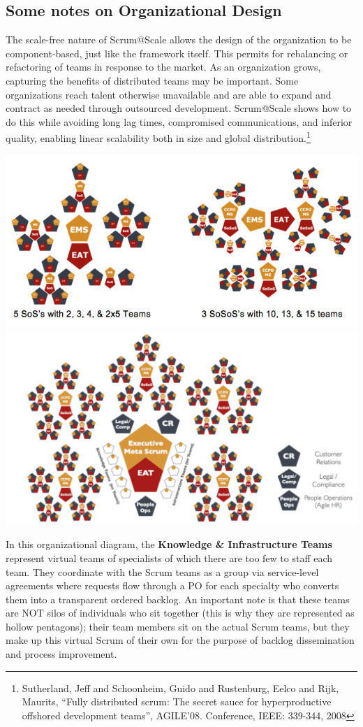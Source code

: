 \documentclass[12pt,a4paper,parskip=full]{scrartcl}
\begin{document}
\subsection{Some notes on Organizational Design}
The scale-free nature of Scrum@Scale allows the design of the organization
to be component-based, just like the framework itself. This permits for
rebalancing or refactoring of teams in response to the market. As an
organization grows, capturing the benefits of distributed teams may be
important. Some organizations reach talent otherwise unavailable and are
able to expand and contract as needed through outsourced development.
Scrum@Scale shows how to do this while avoiding long lag times, compromised
communications, and inferior quality, enabling linear scalability both in
size and global distribution.\footnote{Sutherland, Jeff and Schoonheim,
Guido and Rustenburg, Eelco and Rijk, Maurits, ``Fully distributed scrum:
The secret sauce for hyperproductive offshored development teams'',
AGILE'08. Conference, IEEE: 339-344, 2008}

\includegraphics[width=1.0\linewidth]{VariableSoS-R2.png}
\includegraphics[width=1.0\linewidth]{OrganizationalDiagram.png}

In this organizational diagram, the \textbf{Knowledge \& Infrastructure
Teams} represent virtual teams of specialists of which there are too few to
staff each team. They coordinate with the Scrum teams as a group via
service-level agreements where requests flow through a PO for each
specialty who converts them into a transparent ordered backlog. An
important note is that these teams are NOT silos of individuals who sit
together (this is why they are represented as hollow pentagons); their team
members sit on the actual Scrum teams, but they make up this virtual Scrum
of their own for the purpose of backlog dissemination and process
improvement.
\end{document}
